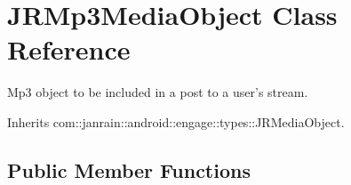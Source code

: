 \hypertarget{classcom_1_1janrain_1_1android_1_1engage_1_1types_1_1_j_r_mp3_media_object}{
\section{JRMp3MediaObject Class Reference}
\label{classcom_1_1janrain_1_1android_1_1engage_1_1types_1_1_j_r_mp3_media_object}
}


Mp3 object to be included in a post to a user's stream.  




Inherits com::janrain::android::engage::types::JRMediaObject.

\subsection*{Public Member Functions}

